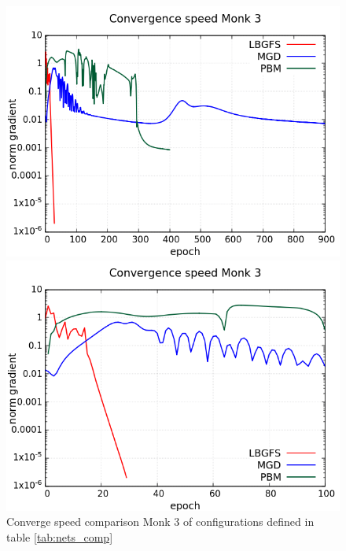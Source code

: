 \begin{figure}[H]
	\centering
	\begin{minipage}[t]{0.5\linewidth}
		\includegraphics[width=\linewidth]{data/Comparison/Monk3/Monk3_CS_Comparison_log_standard.png}
	\end{minipage}%
	\begin{minipage}[t]{0.5\linewidth}
		\includegraphics[width=\linewidth]{data/Comparison/Monk3/Monk3_CS_Comparison_log_zoom.png}
	\end{minipage}
	\caption{Converge speed comparison Monk 3 of configurations defined in table \ref{tab:nets_comp}}
	\label{CS-onk3}
\end{figure}

